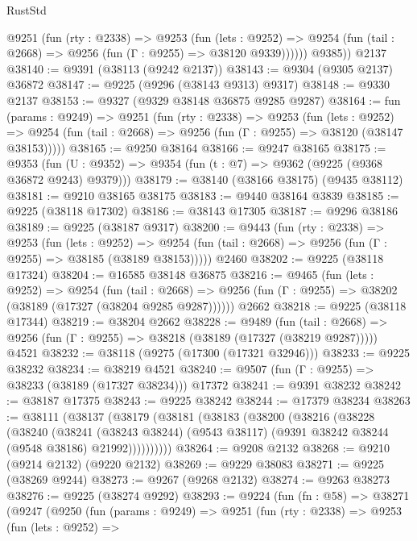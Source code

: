 \begin{lexlean}{RustStd}
\begin{coremodule}
          @9251
            (fun (rty : @2338) =>
            @9253
              (fun (lets : @9252) =>
              @9254 (fun (tail : @2668) => @9256 (fun (Γ : @9255) => @38120 @9339))))))
        @9385))
    @2137
@38140 := @9391 (@38113 (@9242 @2137))
@38143 := @9304 (@9305 @2137) @36872
@38147 := @9225 (@9296 (@38143 @9313) @9317)
@38148 := @9330 @2137
@38153 := @9327 (@9329 @38148 @36875 @9285 @9287)
@38164 := fun (params : @9249) =>
  @9251
    (fun (rty : @2338) =>
    @9253
      (fun (lets : @9252) =>
      @9254 (fun (tail : @2668) => @9256 (fun (Γ : @9255) => @38120 (@38147 @38153)))))
@38165 := @9250 @38164
@38166 := @9247 @38165
@38175 := @9353
    (fun (U : @9352) => @9354 (fun (t : @7) => @9362 (@9225 (@9368 @36872 @9243) @9379)))
@38179 := @38140 (@38166 @38175) (@9435 @38112)
@38181 := @9210 @38165 @38175
@38183 := @9440 @38164 @3839
@38185 := @9225 (@38118 @17302)
@38186 := @38143 @17305
@38187 := @9296 @38186
@38189 := @9225 (@38187 @9317)
@38200 := @9443
    (fun (rty : @2338) =>
    @9253
      (fun (lets : @9252) =>
      @9254 (fun (tail : @2668) => @9256 (fun (Γ : @9255) => @38185 (@38189 @38153)))))
    @2460
@38202 := @9225 (@38118 @17324)
@38204 := @16585 @38148 @36875
@38216 := @9465
    (fun (lets : @9252) =>
    @9254
      (fun (tail : @2668) =>
      @9256 (fun (Γ : @9255) => @38202 (@38189 (@17327 (@38204 @9285 @9287))))))
    @2662
@38218 := @9225 (@38118 @17344)
@38219 := @38204 @2662
@38228 := @9489
    (fun (tail : @2668) => @9256 (fun (Γ : @9255) => @38218 (@38189 (@17327 (@38219 @9287)))))
    @4521
@38232 := @38118 (@9275 (@17300 (@17321 @32946)))
@38233 := @9225 @38232
@38234 := @38219 @4521
@38240 := @9507 (fun (Γ : @9255) => @38233 (@38189 (@17327 @38234))) @17372
@38241 := @9391 @38232
@38242 := @38187 @17375
@38243 := @9225 @38242
@38244 := @17379 @38234
@38263 := @38111
    (@38137
      (@38179
        (@38181
          (@38183
            (@38200
              (@38216
                (@38228
                  (@38240
                    (@38241
                      (@38243 @38244)
                      (@9543 @38117)
                      (@9391 @38242 @38244 (@9548 @38186) @21992))))))))))
@38264 := @9208 @2132
@38268 := @9210 (@9214 @2132) (@9220 @2132)
@38269 := @9229 @38083
@38271 := @9225 (@38269 @9244)
@38273 := @9267 (@9268 @2132)
@38274 := @9263 @38273
@38276 := @9225 (@38274 @9292)
@38293 := @9224
    (fun (fn : @58) =>
    @38271
      (@9247
        (@9250
          (fun (params : @9249) =>
          @9251
            (fun (rty : @2338) =>
            @9253
              (fun (lets : @9252) =>

\end{coremodule}
\end{lexlean}
